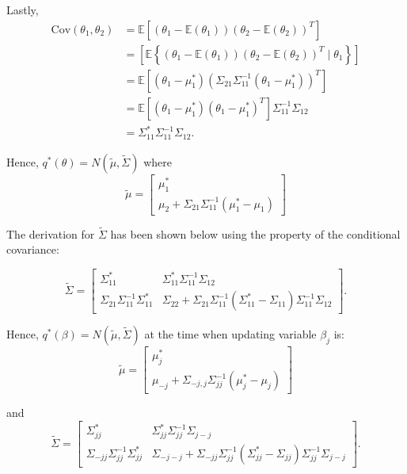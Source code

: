 \noindent Lastly,
$$
\begin{array}{rl}
	\mbox{Cov}(\theta_1,\theta_2) 
	&  = \mathbb{E}[(\theta_1 - \mathbb{E}(\theta_1))(\theta_2 - \mathbb{E}(\theta_2))^T] 
	\\ [2ex]
	&  = \left[ \mathbb{E}\left\{ (\theta_1 - \mathbb{E}(\theta_1))(\theta_2 - \mathbb{E}(\theta_2))^T \mid \theta_1 \right\} \right]     \\ [2ex]
	& = \mathbb{E}\left[ \left(\theta_1 - \mu_1^* \right)\left(  \Sigma_{21}\Sigma_{11}^{-1}(\theta_1 - \mu_1^*)    \right)^T\right] 
	\\ [2ex]
	&  = \mathbb{E}\left[ \left(\theta_1 - \mu_1^* \right)\left(  \theta_1 - \mu_1^* \right)^T\right] \Sigma_{11}^{-1}\Sigma_{12}
	\\ [2ex]
	&  = \Sigma_{11}^* \Sigma_{11}^{-1}\Sigma_{12}.
\end{array} 
$$

\noindent Hence, $q^*(\theta) = N(\widetilde{\mu},\widetilde{\Sigma})$ where
$$
\widetilde{\mu} =
\left[ \begin{array}{c}
	\mu_1^* \\
	\mu_2 + \Sigma_{21}\Sigma_{11}^{-1}\left(\mu_1^* - \mu_1\right)
\end{array} \right]
$$

The derivation for $\tilde{\Sigma}$ has been shown below using the property of the conditional covariance:

$$
\widetilde{\Sigma} = 
\left[ \begin{array}{cc}
	\Sigma_{11}^* & \Sigma_{11}^* \Sigma_{11}^{-1}\Sigma_{12} \\
	\Sigma_{21}  \Sigma_{11}^{-1}\Sigma_{11}^* & \Sigma_{22} 
	+ \Sigma_{21}\Sigma_{11}^{-1}  ( \Sigma_{11}^* -\Sigma_{11})  \Sigma_{11}^{-1} \Sigma_{12}
\end{array} \right].
$$




\noindent Hence, $q^*(\beta) = N(\widetilde{\mu},\widetilde{\Sigma})$ at the time when updating variable $\beta_j$ is:
\begin{equation}
	\label{eq:LG_mu}
	\widetilde{\mu} =
	\left[ \begin{array}{c}
		\mu_j^* \\
		\mu_{-j} + \Sigma_{-j,j}\Sigma_{jj}^{-1}\left(\mu_j^* - \mu_j\right)
	\end{array} \right]
\end{equation}

\noindent and
\begin{equation}
	\label{eq:LG_sigma}
	\widetilde{\Sigma} = 
	\left[ \begin{array}{cc}
		\Sigma_{jj}^* & \Sigma_{jj}^* \Sigma_{jj}^{-1}\Sigma_{j-j} \\
		\Sigma_{-jj}  \Sigma_{jj}^{-1}\Sigma_{jj}^* & \Sigma_{-j-j} 
		+ \Sigma_{-jj}\Sigma_{jj}^{-1}  ( \Sigma_{jj}^* -\Sigma_{jj})  \Sigma_{jj}^{-1} \Sigma_{j-j}
	\end{array} \right].
\end{equation}


